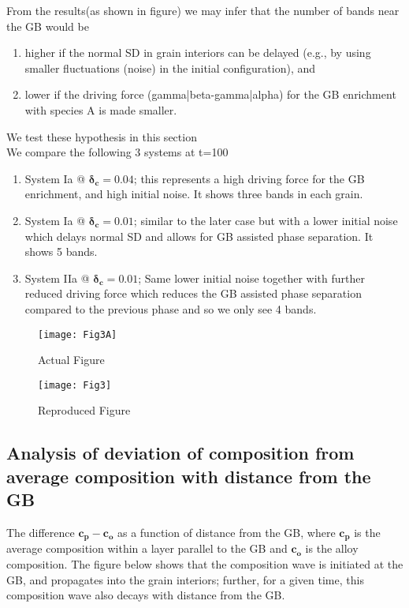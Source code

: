 From the results(as shown in figure) we may infer that the number of bands near the GB would be 
\begin{enumerate}
\item higher if the normal SD in grain interiors can be delayed (e.g., by using smaller fluctuations (noise) in the initial configuration), and  
\item lower if the driving force (gamma|beta-gamma|alpha) for the GB enrichment with species A is made smaller. \end{enumerate}

We test these hypothesis in this section\\
We compare the following 3 systems at t=100
\begin{enumerate}

\item System Ia @ $\mathbold{\delta_c = 0.04}$; this represents a high driving force for the GB enrichment, and high initial noise. It shows three bands in each grain.
\item System Ia @ $\mathbold{\delta_c = 0.01}$; similar to the later case but with a lower initial noise which delays normal SD and allows for GB assisted phase separation. It shows 5 bands.
\item System IIa @ $\mathbold{\delta_c = 0.01}$; Same lower initial noise together with further reduced driving force which reduces the GB assisted phase separation compared to the previous phase and so we only see 4 bands.

\end{enumerate}

\begin{figure}[H]
\texttt{[image: Fig3A]}
\caption{Actual Figure}
\end{figure}

\begin{figure}[H]
\texttt{[image: Fig3]}
\caption{Reproduced Figure}
\end{figure}

\subsection{Analysis of deviation of composition from average composition with distance from the GB}
The difference $\mathbold{c_p-c_o}$ as a function of distance from the GB, where $\mathbold{c_p}$ is the average composition within a layer parallel to the GB and $\mathbold{c_o}$ is the alloy composition. The figure below shows that the composition wave is initiated at the GB, and propagates into the grain interiors; further, for a given time, this composition wave also decays with distance from the GB.

